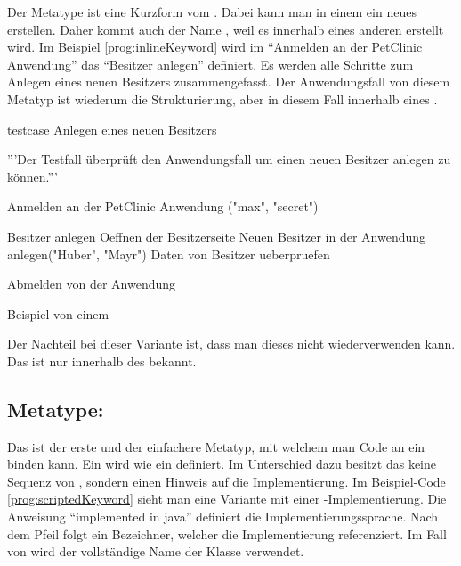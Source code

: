Der Metatype  ist eine Kurzform vom . Dabei kann man in einem  ein neues  erstellen. Daher kommt auch der Name , weil es innerhalb eines anderen  erstellt wird. Im Beispiel \ref{prog:inlineKeyword} wird im  "`Anmelden an der PetClinic Anwendung"' das  "`Besitzer anlegen"' definiert. Es werden alle Schritte zum Anlegen eines neuen Besitzers zusammengefasst. Der Anwendungsfall von diesem Metatyp ist wiederum die Strukturierung, aber in diesem Fall innerhalb eines . 

\begin{program}
\begin{JavaCode}
testcase Anlegen eines neuen Besitzers {
	'''Der Testfall überprüft den Anwendungsfall um einen 
	   neuen Besitzer anlegen zu können.'''
	
	Anmelden an der PetClinic Anwendung ("max", "secret")
	
	Besitzer anlegen {
		Oeffnen der Besitzerseite		
		Neuen Besitzer in der Anwendung anlegen("Huber", "Mayr")
		Daten von Besitzer ueberpruefen
	}
	
	Abmelden von der Anwendung
}
\end{JavaCode}
\caption{Beispiel von einem }
\label{prog:inlineKeyword}
\end{program}

\SuperPar
Der Nachteil bei dieser Variante ist, dass man dieses  nicht wiederverwenden kann. Das  ist nur innerhalb des  bekannt.


\subsection{Metatype: }

Das  ist der erste und der einfachere Metatyp, mit welchem man Code an ein  binden kann. Ein  wird wie ein  definiert. Im Unterschied dazu besitzt das  keine Sequenz von , sondern einen Hinweis auf die Implementierung. Im Beispiel-Code \ref{prog:scriptedKeyword} sieht man eine Variante mit einer -Implementierung. Die Anweisung "`implemented in java"' definiert die Implementierungssprache. Nach dem Pfeil folgt ein Bezeichner, welcher die Implementierung referenziert. Im Fall von  wird der vollständige Name der Klasse verwendet.

